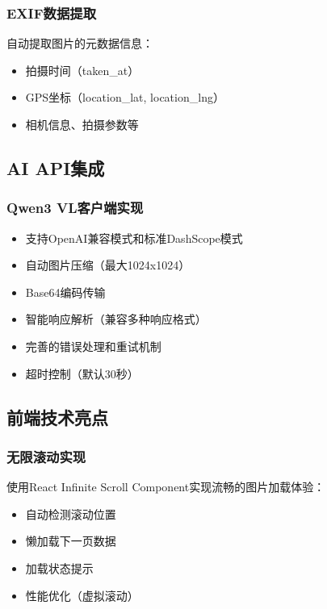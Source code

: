 \documentclass[12pt,a4paper]{article}
\begin{document}
\subsubsection{EXIF数据提取}
自动提取图片的元数据信息：
\begin{itemize}
    \item 拍摄时间（taken\_at）
    \item GPS坐标（location\_lat, location\_lng）
    \item 相机信息、拍摄参数等
\end{itemize}

\subsection{AI API集成}

\subsubsection{Qwen3 VL客户端实现}
\begin{tcolorbox}[colback=green!5!white,colframe=green!75!black,title=关键特性]
\begin{itemize}
    \item 支持OpenAI兼容模式和标准DashScope模式
    \item 自动图片压缩（最大1024x1024）
    \item Base64编码传输
    \item 智能响应解析（兼容多种响应格式）
    \item 完善的错误处理和重试机制
    \item 超时控制（默认30秒）
\end{itemize}
\end{tcolorbox}

\subsection{前端技术亮点}

\subsubsection{无限滚动实现}
使用React Infinite Scroll Component实现流畅的图片加载体验：
\begin{itemize}
    \item 自动检测滚动位置
    \item 懒加载下一页数据
    \item 加载状态提示
    \item 性能优化（虚拟滚动）
\end{itemize}
\end{document}

